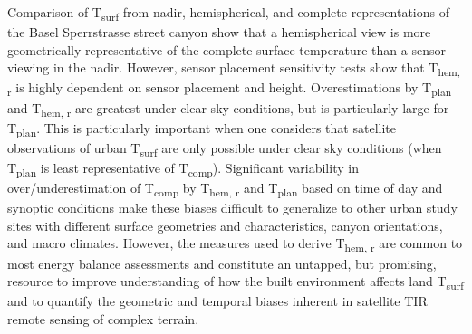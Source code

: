 \begin{bibunit}
Comparison of T\textsubscript{surf} from nadir, hemispherical, and complete representations of the Basel Sperrstrasse street canyon show that a hemispherical view is more geometrically representative of the complete surface temperature than a sensor viewing in the nadir. However, sensor placement sensitivity tests show that T\textsubscript{hem, r} is highly dependent on sensor placement and height. Overestimations by T\textsubscript{plan} and T\textsubscript{hem, r} are greatest under clear sky conditions, but is particularly large for T\textsubscript{plan}. This is particularly important when one considers that satellite observations of urban T\textsubscript{surf} are only possible under clear sky conditions (when T\textsubscript{plan} is least representative of T\textsubscript{comp}). Significant variability in over/underestimation of T\textsubscript{comp} by T\textsubscript{hem, r} and T\textsubscript{plan} based on time of day and synoptic conditions make these biases difficult to generalize to other urban study sites with different surface geometries and characteristics, canyon orientations, and macro climates. However, the measures used to derive T\textsubscript{hem, r} are common to most energy balance assessments and constitute an untapped, but promising, resource to improve understanding of how the built environment affects land T\textsubscript{surf} and to quantify the geometric and temporal biases inherent in satellite TIR remote sensing of complex terrain. 

\cleardoublepage 
{}  
\renewcommand*{\bibname}{References}

\putbib
\end{bibunit}